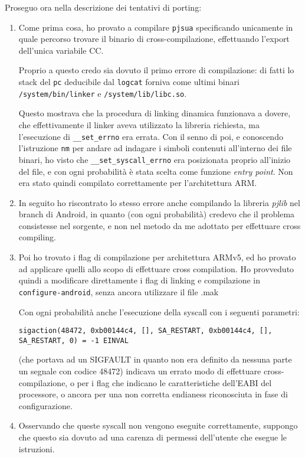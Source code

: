 Proseguo ora nella descrizione dei tentativi di porting:
\begin{enumerate}
\item Come prima cosa, ho provato a compilare \texttt{\small pjsua} specificando unicamente
       in quale percorso trovare il binario di cross-compilazione, effettuando
       l'export dell'unica variabile CC. 
       
       Proprio a questo credo sia dovuto il primo errore di compilazione: di
       fatti lo stack del \texttt{pc} deducibile dal \texttt{logcat} forniva come
       ultimi binari \texttt{/system/bin/linker} e \texttt{/system/lib/libc.so}.
       
       Questo mostrava che la procedura di linking dinamica funzionava a dovere,
       che effettivamente il linker aveva utilizzato la libreria richiesta,
       ma l'esecuzione di \texttt{\_\_set\_errno} era errata. Con il senno di poi,
       e conoscendo l'istruzione \texttt{nm} per andare ad indagare i simboli
       contenuti all'interno dei file binari, ho visto che \texttt{\_\_set\_syscall\_errno}
       era posizionata proprio all'inizio del file, e con ogni probabilità è
       stata scelta come funzione \textit{entry point}. Non era stato quindi compilato
       correttamente per l'architettura ARM.
\item In seguito ho riscontrato lo stesso errore anche compilando la libreria 
       \textit{pjlib} nel branch di Android, in quanto (con ogni probabilità) credevo
       che il problema consistesse nel sorgente, e non nel metodo da me
       adottato per effettuare cross compiling.
\item Poi ho trovato i flag di compilazione per architettura ARMv5, ed
       ho provato ad applicare quelli allo scopo di effettuare cross compilation.
       Ho provveduto quindi a modificare direttamente  i flag di linking e compilazione
       in \texttt{\small configure-android},
       senza ancora utilizzare il file .mak
       
       Con ogni probabilità anche l'esecuzione della syscall con i seguenti parametri:
       \begin{center}
       \texttt{\small sigaction(48472, {0xb00144c4, [], SA\_RESTART}, {0xb00144c4, [], SA\_RESTART}, 0) = -1 EINVAL}
       \end{center}
       (che portava ad un SIGFAULT in quanto non era definito da nessuna parte un
       segnale con codice 48472) indicava un errato modo di effettuare cross-compilazione,
       o per i flag che indicano le caratteristiche dell'EABI del processore, o
       ancora per una non corretta endianess riconosciuta in fase di configurazione.
\item Osservando che queste syscall non vengono eseguite correttamente,
       suppongo che questo sia dovuto ad una carenza di permessi dell'utente
       che esegue le istruzioni. 
       

\end{enumerate}
